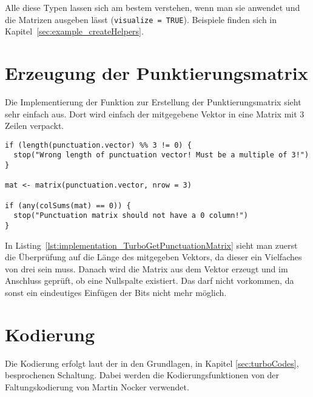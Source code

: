 Alle diese Typen lassen sich am bestem verstehen, wenn man sie anwendet und die Matrizen ausgeben lässt (\texttt{visualize = TRUE}). Beispiele finden sich in Kapitel~\ref{sec:example_createHelpers}.

\FloatBarrier
\section{Erzeugung der Punktierungsmatrix}
\label{sec:implementation_puncturing}
Die Implementierung der Funktion zur Erstellung der Punktierungsmatrix sieht sehr einfach aus. Dort wird einfach der mitgegebene Vektor in eine Matrix mit 3 Zeilen verpackt. 

\begin{lstlisting}[caption=Implementierung von \texttt{TurboGetPunctuationMatrix}, label={lst:implementation_TurboGetPunctuationMatrix}, float=!th]
if (length(punctuation.vector) %% 3 != 0) {
  stop("Wrong length of punctuation vector! Must be a multiple of 3!")
}

mat <- matrix(punctuation.vector, nrow = 3)

if (any(colSums(mat) == 0)) {
  stop("Punctuation matrix should not have a 0 column!")
}
\end{lstlisting}

In Listing~\ref{lst:implementation_TurboGetPunctuationMatrix} sieht man zuerst die Überprüfung auf die Länge des mitgegeben Vektors, da dieser ein Vielfaches von drei sein muss. Danach wird die Matrix aus dem Vektor erzeugt und im Anschluss geprüft, ob eine Nullspalte existiert. Das darf nicht vorkommen, da sonst ein eindeutiges Einfügen der Bits nicht mehr möglich.

\FloatBarrier
\section{Kodierung}
\label{sec:implementation_encode}
Die Kodierung erfolgt laut der in den Grundlagen, in Kapitel \ref{sec:turboCodes}, besprochenen Schaltung. Dabei werden die Kodierungsfunktionen von der Faltungskodierung von Martin Nocker \cite{nocker} verwendet.

